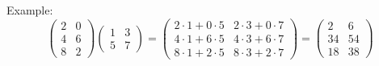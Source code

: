 \documentclass[
  letterpaper,
  DIV=11,
  numbers=noendperiod]{scrartcl}
\theoremstyle{remark}
\begin{document}
Example: \[\begin{pmatrix}
     2  &0  \\
     4  &6  \\
     8  &2
  \end{pmatrix}
  \begin{pmatrix}
    1  &3  \\
    5  &7
  \end{pmatrix}
  =
  \begin{pmatrix}
   2\cdot 1+0\cdot 5  &2\cdot 3+0\cdot 7  \\
   4\cdot 1+6\cdot 5  &4\cdot 3+6\cdot 7  \\
   8\cdot 1+2\cdot 5  &8\cdot 3+2\cdot 7
  \end{pmatrix}
  =
  \begin{pmatrix}
    2  &6  \\
   34  &54 \\
   18  &38
  \end{pmatrix}\]
\end{document}
